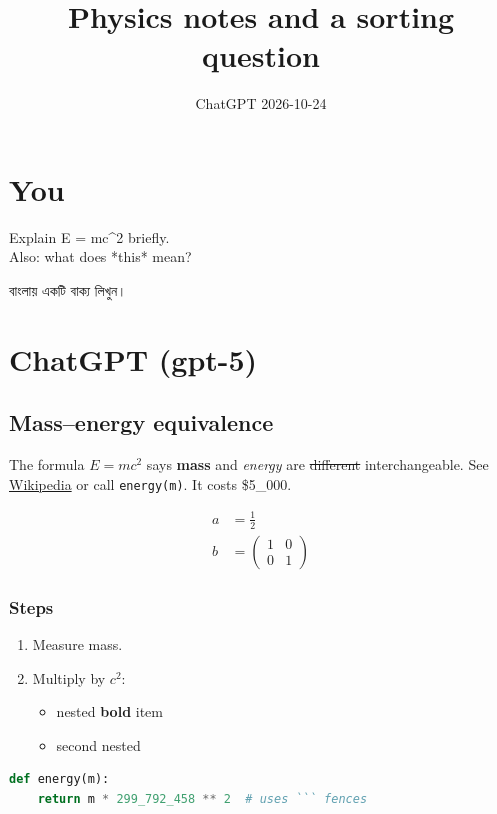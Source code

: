 \documentclass[11pt,a4paper]{article}
\title{Physics notes and a sorting question}
\date{ChatGPT \textperiodcentered{} 2026-10-24}
\begin{document}
\maketitle

\section*{You}

Explain E = mc\textasciicircum{}2 briefly.\\
Also: what does *this* mean?

বাংলায় একটি বাক্য লিখুন।


\section*{ChatGPT (gpt-5)}

\subsection*{Mass–energy equivalence}

The formula $E = mc^2$ says \textbf{mass} and \emph{energy} are \sout{different} interchangeable. See \href{https://en.wikipedia.org/wiki/Mass\%E2\%80\%93energy_equivalence}{Wikipedia} or call \texttt{energy(m)}. It costs \$5\_000.

\[
\begin{aligned} a &= \frac{1}{2} \\ b &= \begin{pmatrix} 1 & 0 \\ 0 & 1 \end{pmatrix} \end{aligned}
\]

\subsubsection*{Steps}

\begin{enumerate}
  \item Measure mass.
  \item Multiply by $c^2$:
    
    \begin{itemize}
      \item nested \textbf{bold} item
      \item second nested
    \end{itemize}
\end{enumerate}

\begin{lstlisting}[language=python]
def energy(m):
    return m * 299_792_458 ** 2  # uses ``` fences
\end{lstlisting}
\end{document}
